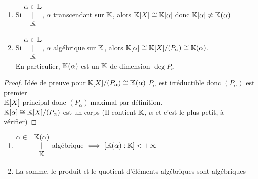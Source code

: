 \documentclass[]{report}
\begin{document}
    \begin{prop}{}{}
        \begin{enumerate}
            \item Si $\begin{matrix}
                \alpha \in\mathbb{L}\\
                |\\
                \mathbb{K}
            \end{matrix}$, $\alpha$ transcendant sur $\mathbb{K}$, alors $\mathbb{K}[X]\cong\mathbb{K}[\alpha]$ donc $\mathbb{K}[\alpha]\neq \mathbb{K}(\alpha)$
            \item Si $\begin{matrix}
                \alpha \in\mathbb{L}\\
                |\\
                \mathbb{K}
            \end{matrix}$, $\alpha$ algébrique sur $\mathbb{K}$, alors $\mathbb{K}[\alpha]\cong \mathbb{K}[X]/(P_\alpha)\cong \mathbb{K}(\alpha)$.\\
            En particulier, $\mathbb{K}(\alpha)$ est un $\mathbb{K}$-\ev de dimension $\deg P_\alpha$
        \end{enumerate}
    \end{prop}

    \begin{proof}{Idée de preuve pour $\mathbb{K}[X]/(P_\alpha)\cong\mathbb{K}(\alpha)$}{}
        $P_\alpha$ est irréductible donc $(P_\alpha)$ est premier\\
        $\mathbb{K}[X]$ principal donc $(P_\alpha)$ maximal par définition.\\
        $\mathbb{K}[\alpha]\cong\mathbb{K}[X]/(P_\alpha)$ est un corps (Il contient $\mathbb{K}$, $\alpha$ et c'est le plus petit, à vérifier)
    \end{proof}

    \begin{cor}{}{}
        \begin{enumerate}
            \item $\begin{matrix}
                \alpha\in &\mathbb{K}(\alpha)\\
                &|\\
                &\mathbb{K}
            \end{matrix}$ algébrique $\iff [\mathbb{K}(\alpha):\mathbb{K}]<+\infty$
            \item La somme, le produit et le quotient d'éléments algébriques sont algébriques
        \end{enumerate}
    \end{cor}
\end{document}
